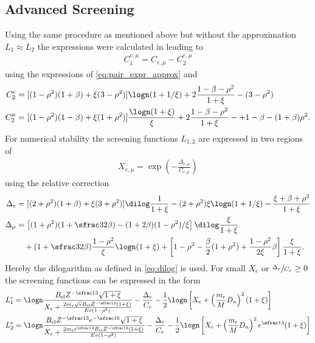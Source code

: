 \subsection{Advanced Screening}

Using the same procedure as mentioned above but without the approximation $L_1 \approx L_2$ the expressions were calculated in \cite{Sandrock18PhD} leading to
\begin{align}
    C_1^{e,\mu} = C_{e,\mu} - C_2^{e,\mu}
\end{align}
using the expressions of \eqref{eq:pair_expr_approx} and
\begin{subequations}
\begin{align}
    C_2^e &= [(1 - \rho^2)(1 + \beta) + \xi(3 - \rho^2)] \logn(1 + 1/\xi) + 2 \frac{1 - \beta - \rho^2}{1 + \xi} - (3 - \rho^2)
    \\
    C_2^\mu &= [(1 - \rho^2)(1 - \beta) + \xi(1 + \rho^2)] \frac{\logn(1 + \xi)}{\xi} + 2 \frac{1 - \beta - \rho^2}{1 + \xi} - + 1 - \beta - (1 + \beta)\rho^2 .
\end{align}
\end{subequations}
For numerical stability the screening functions $L_{1,2}$ are expressed in two regions of
\begin{align}
    X_{e,\mu} = \exp \left( -\frac{\Delta_{e,\mu}}{C_{e,\mu}} \right)
\end{align}
using the relative correction
\begin{subequations}
\begin{align}
    \Delta_e &= [(2 + \rho^2)(1 + \beta) + \xi(3 + \rho^2)] \dilog \frac{1}{1 + \xi} - (2 + \rho^2) \xi \logn(1 + 1/\xi) - \frac{\xi + \beta + \rho^2}{1 + \xi}
    \\
    \Delta_\mu &= \left[ (1 + \rho^2)(1 + \sfrac32 \beta) - (1 + 2\beta)(1 - \rho^2)/\xi \right] \dilog \frac{\xi}{1 + \xi} \\
    &\quad+ (1 + \sfrac32 \beta) \frac{1 - \rho^2}{\xi} \logn(1 + \xi)
    + \left[ 1 - \rho^2 - \frac{\beta}{2}(1 + \rho^2) + \frac{1 - \rho^2}{2\xi}\beta \right] \frac{\xi}{1 + \xi} . \nonumber
\end{align}
\end{subequations}
Hereby the dilogarithm as defined in \eqref{eq:dilog} is used.
For small $X_e$ or $\sfrac{\Delta_e}{C_e} \geq 0$ the screening functions can be expressed in the form
\begin{subequations}
\begin{align}
    L_1^e &= \logn \frac{B_{\text{el}}Z^{-\sfrac13}\sqrt{1 + \xi}}{X_e + \frac{2m_e\sqrt{e}B_{\text{el}}Z^{-\sfrac13}(1 + \xi)}{Ev(1 - \rho^2)}}
        - \frac{\Delta_e}{C_e}
        - \frac{1}{2}\logn \left[ X_e + \left(\frac{m_e}{M}D_n\right)^2 (1 + \xi) \right]
    \\
    L_2^e &= \logn \frac{B_{\text{el}}Z^{-\sfrac13} e^{-\sfrac16} \sqrt{1 + \xi}}{X_e + \frac{2m_e e^{\sfrac13} B_{\text{el}}Z^{-\sfrac13}(1 + \xi)}{Ev(1 - \rho^2)}}
        - \frac{\Delta_e}{C_e}
        - \frac{1}{2} \logn \left[ X_e + \left(\frac{m_e}{M}D_n\right)^2 e^{\sfrac13} (1 + \xi) \right]
\end{align}
\end{subequations}
